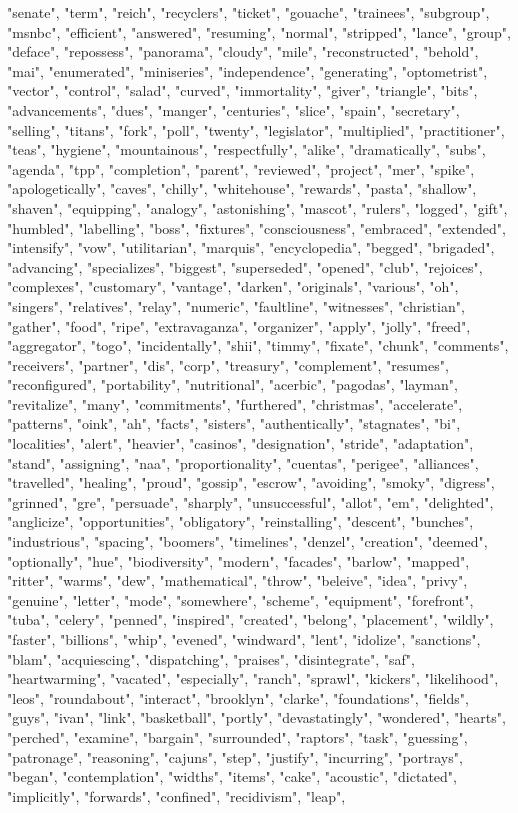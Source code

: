 "senate", "term", "reich", "recyclers", "ticket", "gouache", "trainees", "subgroup", "msnbc", "efficient", "answered", "resuming", "normal", "stripped", "lance", "group", "deface", "repossess", "panorama", "cloudy", "mile", "reconstructed", "behold", "mai", "enumerated", "miniseries", "independence", "generating", "optometrist", "vector", "control", "salad", "curved", "immortality", "giver", "triangle", "bits", "advancements", "dues", "manger", "centuries", "slice", "spain", "secretary", "selling", "titans", "fork", "poll", "twenty", "legislator", "multiplied", "practitioner", "teas", "hygiene", "mountainous", "respectfully", "alike", "dramatically", "subs", "agenda", "tpp", "completion", "parent", "reviewed", "project", "mer", "spike", "apologetically", "caves", "chilly", "whitehouse", "rewards", "pasta", "shallow", "shaven", "equipping", "analogy", "astonishing", "mascot", "rulers", "logged", "gift", "humbled", "labelling", "boss", "fixtures", "consciousness", "embraced", "extended", "intensify", "vow", "utilitarian", "marquis", "encyclopedia", "begged", "brigaded", "advancing", "specializes", "biggest", "superseded", "opened", "club", "rejoices", "complexes", "customary", "vantage", "darken", "originals", "various", "oh", "singers", "relatives", "relay", "numeric", "faultline", "witnesses", "christian", "gather", "food", "ripe", "extravaganza", "organizer", "apply", "jolly", "freed", "aggregator", "togo", "incidentally", "shii", "timmy", "fixate", "chunk", "comments", "receivers", "partner", "dis", "corp", "treasury", "complement", "resumes", "reconfigured", "portability", "nutritional", "acerbic", "pagodas", "layman", "revitalize", "many", "commitments", "furthered", "christmas", "accelerate", "patterns", "oink", "ah", "facts", "sisters", "authentically", "stagnates", "bi", "localities", "alert", "heavier", "casinos", "designation", "stride", "adaptation", "stand", "assigning", "naa", "proportionality", "cuentas", "perigee", "alliances", "travelled", "healing", "proud", "gossip", "escrow", "avoiding", "smoky", "digress", "grinned", "gre", "persuade", "sharply", "unsuccessful", "allot", "em", "delighted", "anglicize", "opportunities", "obligatory", "reinstalling", "descent", "bunches", "industrious", "spacing", "boomers", "timelines", "denzel", "creation", "deemed", "optionally", "hue", "biodiversity", "modern", "facades", "barlow", "mapped", "ritter", "warms", "dew", "mathematical", "throw", "beleive", "idea", "privy", "genuine", "letter", "mode", "somewhere", "scheme", "equipment", "forefront", "tuba", "celery", "penned", "inspired", "created", "belong", "placement", "wildly", "faster", "billions", "whip", "evened", "windward", "lent", "idolize", "sanctions", "blam", "acquiescing", "dispatching", "praises", "disintegrate", "saf", "heartwarming", "vacated", "especially", "ranch", "sprawl", "kickers", "likelihood", "leos", "roundabout", "interact", "brooklyn", "clarke", "foundations", "fields", "guys", "ivan", "link", "basketball", "portly", "devastatingly", "wondered", "hearts", "perched", "examine", "bargain", "surrounded", "raptors", "task", "guessing", "patronage", "reasoning", "cajuns", "step", "justify", "incurring", "portrays", "began", "contemplation", "widths", "items", "cake", "acoustic", "dictated", "implicitly", "forwards", "confined", "recidivism", "leap", 
